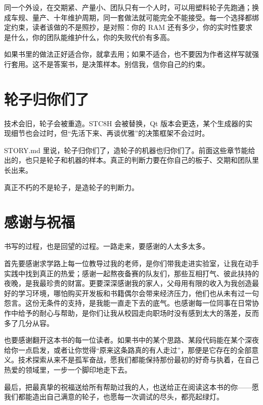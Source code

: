 同一个外设，在交期紧、产量小、团队只有一个人时，可以用塑料轮子先跑通；换成车规、量产、十年维护周期，同一套做法就可能完全不能接受。每一个选择都绑定约束，读者该做的不是照抄，是对照：你的 RAM 还有多少，你的实时性要求是什么，你的团队能维护什么，你的失败代价有多高。

如果书里的做法正好适合你，就拿去用；如果不适合，也不要因为作者这样写就强行套用。这不是答案书，是决策样本。别信我，信你自己的约束。

\section{轮子归你们了}

技术会旧，轮子会被重造。STC8H 会被替换，Qt 版本会更迭，某个生成器的实现细节也会过时，但“先活下来、再谈优雅”的决策框架不会过时。

STORY.md 里说，轮子归你们了，造轮子的机器也归你们了。前面这些章节能给出的，也只是轮子和机器的样本。真正的判断力要在你自己的板子、交期和团队里长出来。

真正不朽的不是轮子，是造轮子的判断力。

\section{感谢与祝福}

书写的过程，也是回望的过程。一路走来，要感谢的人太多太多。

首先要感谢求学路上每一位教导过我的老师，是你们带我走进实验室，让我在动手实践中找到真正的热爱；感谢一起熬夜备赛的队友们，那些互相打气、彼此扶持的夜晚，是我最珍贵的财富。更要深深感谢我的家人，父母用有限的收入为我创造最好的学习环境，哪怕购买开发板和书籍偶尔会带来经济压力，他们也从未有过一句怨言。这份无条件的支持，是我能一直走下去的底气。也感谢每一位同事在日常协作中给予的耐心与帮助，是你们让我从校园走向职场时没有感到太大的落差，反而多了几分从容。

也要感谢翻开这本书的每一位读者。如果书中的某个思路、某段代码能在某个深夜给你一点启发，或者让你觉得“原来这条路真的有人走过”，那便是它存在的全部意义。技术探索从来不是孤军奋战，愿我们都能保持那份最初的好奇与执着，在自己热爱的领域里，一步一个脚印地走下去。

最后，把最真挚的祝福送给所有帮助过我的人，也送给正在阅读这本书的你——愿我们都能造出自己满意的轮子，也愿每一次调试的尽头，都亮起绿灯。
